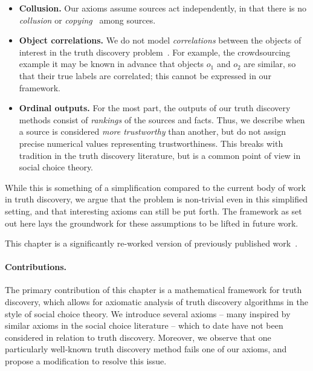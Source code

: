 \begin{itemize}

    \item \textbf{Collusion.} Our axioms assume sources act independently, in
        that there is no \emph{collusion} or
        \emph{copying}~\cite{dong_truth_2009} among sources.

    \item \textbf{Object correlations.} We do not model \emph{correlations}
          between the objects of interest in the truth discovery
          problem~\cite{yang_probabilistic_2019}. For example, the
          crowdsourcing example it may be known in advance that objects $o_1$
          and $o_2$ are similar, so that their true labels are correlated; this
          cannot be expressed in our framework.

    \item \textbf{Ordinal outputs.} For the most part, the outputs of our truth
          discovery methods consist of \emph{rankings} of the sources and
          facts. Thus, we describe when a source is considered \emph{more
          trustworthy} than another, but do not assign precise numerical values
          representing trustworthiness. This breaks with tradition in the truth
          discovery literature, but is a common point of view in social choice
          theory.
\end{itemize}

While this is something of a simplification compared to the current body of
work in truth discovery, we argue that the problem is non-trivial even in this
simplified setting, and that interesting axioms can still be put forth. The
framework as set out here lays the groundwork for these assumptions to be
lifted in future work.

This chapter is a significantly re-worked version of previously published
work~\cite{singleton_booth_2020,singleton2022towards}.

\paragraph{Contributions.}

The primary contribution of this chapter is a mathematical framework for truth
discovery, which allows for axiomatic analysis of truth discovery algorithms in
the style of social choice theory. We introduce several axioms -- many inspired
by similar axioms in the social choice literature -- which to date have not
been considered in relation to truth discovery. Moreover, we observe that one
particularly well-known truth discovery method fails one of our axioms, and
propose a modification to resolve this issue.

